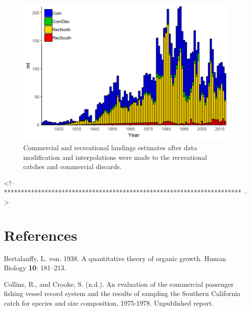 \documentclass[12pt,]{article}
\begin{document}
\begin{figure}
\centering
\includegraphics{Figures/Catches_alternate.png}
\caption{Commercial and recreational landings estimates after data
modification and interpolations were made to the recreational catches
and commercial discards. \label{fig:Catches_alternate}}
\end{figure}

\FloatBarrier

\FloatBarrier

\FloatBarrier
<!-- ********************************************************************** -->

\FloatBarrier

\FloatBarrier

\FloatBarrier

\FloatBarrier

\newpage

\color{black}

\section*{References}\label{references}

\renewcommand{\thepage}{}

\hypertarget{refs}{}
\hypertarget{ref-vonB1938}{}
Bertalanffy, L. von. 1938. A quantitative theory of organic growth.
Human Biology \textbf{10}: 181--213.

\hypertarget{ref-Collins1978}{}
Collins, R., and Crooke, S. (n.d.). An evaluation of the commercial
passenger fishing vessel record system and the results of sampling the
Southern California catch for species and size composition, 1975-1978.
Unpublished report.
\end{document}
